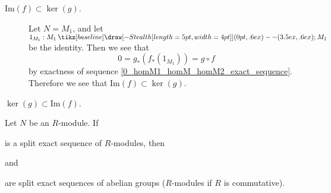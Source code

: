 \documentclass[12pt,letterpaper]{algebra_book}
\renewcommand{\to}{\mathbin{\tikz[baseline] \draw[-{Stealth[length=5pt,width=4pt]}] (0pt,.6ex) -- (3.5ex,.6ex);}}
\newcommand{\im}{\mbox{Im}}
\theoremstyle{definition}
\begin{document}
\begin{prf}
\begin{description}
        \item[$\im(f) \subset \ker(g)$.] 
        Let $N = M_1$, and let $1_{M_1}:M_1 \to M_1$ be the
        identity. Then we see that 
        \[
            0 = g_*(f_*(1_{M_1})) = g \circ f
        \]
        by exactness of sequence
        \ref{0_homM1_homM_homM2_exact_sequence}. Therefore we see
        that $\im(f) \subset \ker(g)$. 

        \item[$\ker(g) \subset \im(f)$.]
        
        


    \end{description}
\end{prf}

\begin{thm}
    Let $N$ be an $R$-module. If 
    \begin{center}
    \end{center}
    is a split exact sequence of $R$-modules, then 
    \begin{center}
    \end{center}
    and 
    \begin{center}
    \end{center}
    are split exact sequences of abelian groups ($R$-modules if
    $R$ is commutative).
\end{thm}
\end{document}
